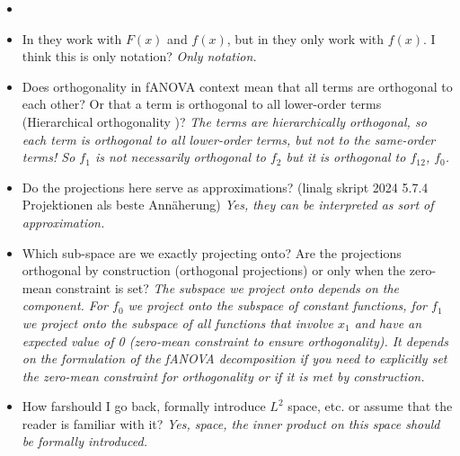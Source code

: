 \begin{itemize}
    \item 
    \item In \cite{hooker2004} they work with $F(x)$ and $f(x)$, but in \cite{sobol2001} they only work with $f(x)$. I think this is only notation? \textit{Only notation.}
    \item Does orthogonality in fANOVA context mean that all terms are orthogonal to each other? Or that a term is orthogonal to all lower-order terms (\ldq Hierarchical orthogonality \rdq)? \textit{The terms are hierarchically orthogonal, so each term is orthogonal to all lower-order terms, but not to the same-order terms! So $f_1$ is not necessarily orthogonal to $f_2$ but it is orthogonal to $f_{12}$, $f_{0}$.} 
    \item Do the projections here serve as approximations? (linalg skript 2024 5.7.4 Projektionen als beste Annäherung) \textit{Yes, they can be interpreted as sort of approximation.}
    \item Which sub-space are we exactly projecting onto? Are the projections orthogonal by construction (orthogonal projections) or only when the zero-mean constraint is set? \textit{The subspace we project onto depends on the component. For $f_0$ we project onto the subspace of constant functions, for $f_1$ we project onto the subspace of all functions that involve $x_1$ and have an expected value of 0 (zero-mean constraint to ensure orthogonality). It depends on the formulation of the fANOVA decomposition if you need to explicitly set the zero-mean constraint for orthogonality or if it is met by construction.}
    \item How \ldq far\rdq should I go back, formally introduce $L^2$ space, etc. or assume that the reader is familiar with it? \textit{Yes, space, the inner product on this space should be formally introduced.}
\end{itemize}



